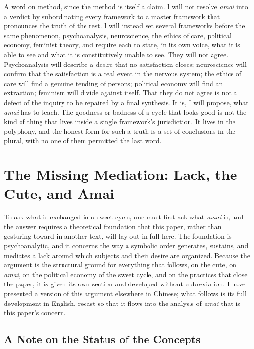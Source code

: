 \documentclass[11pt,a4paper]{article}
\begin{document}
A word on method, since the method is itself a claim. I will not resolve \textit{amai} into a verdict by subordinating every framework to a master framework that pronounces the truth of the rest. I will instead set several frameworks before the same phenomenon, psychoanalysis, neuroscience, the ethics of care, political economy, feminist theory, and require each to state, in its own voice, what it is able to see and what it is constitutively unable to see. They will not agree. Psychoanalysis will describe a desire that no satisfaction closes; neuroscience will confirm that the satisfaction is a real event in the nervous system; the ethics of care will find a genuine tending of persons; political economy will find an extraction; feminism will divide against itself. That they do not agree is not a defect of the inquiry to be repaired by a final synthesis. It is, I will propose, what \textit{amai} has to teach. The goodness or badness of a cycle that looks good is not the kind of thing that lives inside a single framework's jurisdiction. It lives in the polyphony, and the honest form for such a truth is a set of conclusions in the plural, with no one of them permitted the last word.

\section{The Missing Mediation: Lack, the Cute, and Amai}

To ask what is exchanged in a sweet cycle, one must first ask what \textit{amai} is, and the answer requires a theoretical foundation that this paper, rather than gesturing toward in another text, will lay out in full here. The foundation is psychoanalytic, and it concerns the way a symbolic order generates, sustains, and mediates a lack around which subjects and their desire are organized. Because the argument is the structural ground for everything that follows, on the cute, on \textit{amai}, on the political economy of the sweet cycle, and on the practices that close the paper, it is given its own section and developed without abbreviation. I have presented a version of this argument elsewhere in Chinese; what follows is its full development in English, recast so that it flows into the analysis of \textit{amai} that is this paper's concern.

\subsection{A Note on the Status of the Concepts}
\end{document}
